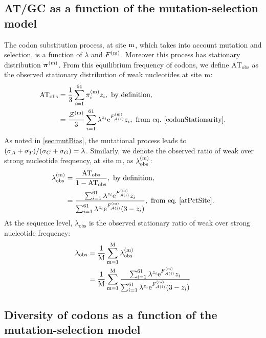 \subsection{AT/GC as a function of the mutation-selection model}
The \gls{codon} \gls{substitution} process, at site $\text{m}$, which takes into account mutation and selection, is a function of $\lambda$ and $F^{(\text{m})}$.
Moreover this process has stationary distribution $\bm{\pi}^{(\text{m})}$.
From this equilibrium frequency of \glspl{codon}, we define $\mathrm{AT_{obs}}$ as the observed stationary distribution of weak nucleotides at site $\text{m}$:
\begin{align}
    \mathrm{AT_{obs}}
    & = \frac{1}{3} \sum_{\ci=1}^{61}  \subequi_{\ci}\siteexp \nbrWeak_{\ci} , \ \textrm{by definition},\\
    & = \frac{\mathcal{Z}\siteexp}{3} \sum_{\ci=1}^{61} \lambda^{\nbrWeak_{\ci}} \e^{\Fiti\siteexp} \nbrWeak_{\ci} , \ \textrm{from eq.} \ \ref{codonStationarity}.
    \label{atPctSite}
\end{align}
As noted in \ref{sec:mutBias}, the mutational process leads to $(\sigma_A+\sigma_T)/(\sigma_C+\sigma_G) = \lambda$.
Similarly, we denote the observed ratio of weak over strong nucleotide frequency, at site $\text{m}$, as $\lambda_{\mathrm{obs}}^{(\text{m})} $:
\begin{align}
    \lambda_{\mathrm{obs}}\siteexp 
    & = \dfrac{\mathrm{AT_{obs}}}{1 - \mathrm{AT_{obs}} }, \ \textrm{by definition},\\
    & = \dfrac{ \sum_{\ci=1}^{61} \lambda^{\nbrWeak_{\ci}} \e^{\Fiti\siteexp} \nbrWeak_{\ci}}{\sum_{\ci=1}^{61} \lambda^{\nbrWeak_{\ci}} \e^{\Fiti\siteexp} (3 - \nbrWeak_{\ci} )}, \ \textrm{from eq.} \ \ref{atPctSite}.
\end{align}
At the sequence level, $\lambda_{\mathrm{obs}} $ is the observed stationary ratio of weak over strong nucleotide frequency:
\begin{align}
    \lambda_{\mathrm{obs}} 
    & = \dfrac{1}{\text{M}} \sum_{\text{m}=1}^{\text{M}} \lambda_{\mathrm{obs}}^{(\text{m})} \\
    & = \dfrac{1}{\text{M}} \sum_{\text{m}=1}^{\text{M}} \dfrac{ \sum_{{i}=1}^{61} \lambda^{{z}_{{i}}} \mathrm{e}^{F_{\mathcal{A}({i})}^{(\text{m})}} {z}_{{i}}}{\sum_{{i}=1}^{61} \lambda^{{z}_{{i}}} \mathrm{e}^{F_{\mathcal{A}({i})}^{(\text{m})}} (3 - {z}_{{i}} )}
\end{align}

\subsection{Diversity of {codons} as a function of the mutation-selection model}

